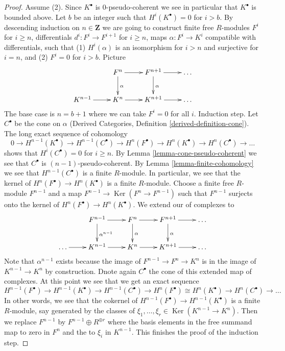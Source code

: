 \documentclass[10pt,a4paper]{amsart}
\theoremstyle{plain}
\theoremstyle{definition}
\theoremstyle{remark}
\numberwithin{equation}{subsection}
\def\Ker{\mathop{\mathrm{Ker}}}
\begin{document}
\begin{proof}
\medskip\noindent
Assume (2). Since $K^\bullet$ is $0$-pseudo-coherent we see in particular
that $K^\bullet$ is bounded above. Let $b$ be an integer such that
$H^i(K^\bullet) = 0$ for $i > b$. By descending induction on
$n \in \mathbf{Z}$ we are going to construct finite free $R$-modules
$F^i$ for $i \geq n$, differentials $d^i : F^i \to F^{i + 1}$ for
$i \geq n$, maps $\alpha : F^i \to K^i$ compatible with differentials,
such that (1) $H^i(\alpha)$ is an isomorphism for $i > n$ and surjective for
$i = n$, and (2) $F^i = 0$ for $i > b$. Picture
$$
\xymatrix{
& F^n \ar[r] \ar[d]^\alpha & F^{n + 1} \ar[d]^\alpha \ar[r] & \ldots \\
K^{n - 1} \ar[r] & K^n \ar[r] & K^{n + 1} \ar[r] & \ldots
}
$$
The base case is $n = b + 1$ where we can take $F^i = 0$ for all $i$.
Induction step. Let $C^\bullet$ be the cone on $\alpha$
(Derived Categories, Definition \ref{derived-definition-cone}).
The long exact sequence of cohomology
$$
0 \to H^{n - 1}(K^\bullet) \to H^{n - 1}(C^\bullet) \to
H^n(F^\bullet) \to H^n(K^\bullet) \to H^n(C^\bullet) \to \ldots
$$
shows that $H^i(C^\bullet) = 0$ for $i \geq n$.
By Lemma \ref{lemma-cone-pseudo-coherent} we see that $C^\bullet$
is $(n - 1)$-pseudo-coherent. By Lemma \ref{lemma-finite-cohomology}
we see that $H^{n - 1}(C^\bullet)$ is a finite $R$-module.
In particular, we see that the kernel of $H^n(F^\bullet) \to H^n(K^\bullet)$
is a finite $R$-module. Choose a finite free $R$-module
$F^{n - 1}$ and a map $F^{n - 1} \to \Ker(F^n \to F^{n - 1})$ such that
$F^{n - 1}$ surjects onto the kernel of $H^n(F^\bullet) \to H^n(K^\bullet)$.
We extend our of complexes to
$$
\xymatrix{
& F^{n - 1} \ar[d]^{\alpha^{n - 1}} \ar[r] &
F^n \ar[r] \ar[d]^\alpha &
F^{n + 1} \ar[d]^\alpha \ar[r] & \ldots \\
\ldots \ar[r] &
K^{n - 1} \ar[r] & K^n \ar[r] & K^{n + 1} \ar[r] & \ldots
}
$$
Note that $\alpha^{n - 1}$ exists because the image of
$F^{n - 1} \to F^n \to K^n$ is in the image of $K^{n - 1} \to K^n$ by
construction. Dnote again $C^\bullet$ the cone of this extended
map of complexes. At this point we see that we get an exact sequence
$$
H^{n - 1}(F^\bullet) \to H^{n - 1}(K^\bullet) \to H^{n - 1}(C^\bullet) \to
H^n(F^\bullet) \cong H^n(K^\bullet) \to H^n(C^\bullet) \to \ldots
$$
In other words, we see that the cokernel of $H^{n - 1}(F^\bullet) \to
H^{n - 1}(K^\bullet)$ is a finite $R$-module, say generated by
the classes of $\xi_1, \ldots, \xi_r \in \Ker(K^{n - 1} \to K^n)$.
Then we replace $F^{n - 1}$ by $F^{n - 1} \oplus R^{\oplus r}$ where
the basis elements in the free summand map to zero in $F^n$ and the
to $\xi_i$ in $K^{n - 1}$. This
finishes the proof of the induction step.
\end{proof}
\end{document}
